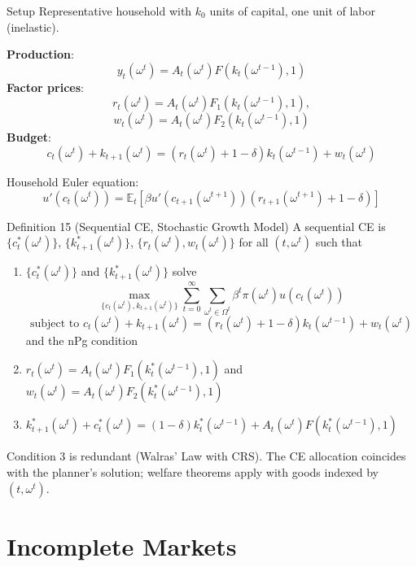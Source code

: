 \documentclass[blue]{beamer}
\newcommand{\E}{\mathbb{E}}
\begin{document}
\begin{frame}{Setup}
	Representative household with $k_0$ units of capital, one unit of labor (inelastic).
	

	\textbf{Production}: $$
	y_t(\omega^t) = A_t(\omega^t) F(k_t(\omega^{t-1}), 1)
	$$
	\textbf{Factor prices}: 
	$$r_t(\omega^t) = A_t(\omega^t) F_1(k_t(\omega^{t-1}), 1),$$ 
	$$
	w_t(\omega^t) = A_t(\omega^t) F_2(k_t(\omega^{t-1}), 1)
	$$
	\textbf{Budget}: 
	$$
	c_t(\omega^t) + k_{t+1}(\omega^t) = (r_t(\omega^t) + 1-\delta)k_t(\omega^{t-1}) + w_t(\omega^t)
	$$
	

	Household Euler equation:
	\[
	u'(c_t(\omega^t)) = \E_t[\beta u'(c_{t+1}(\omega^{t+1}))(r_{t+1}(\omega^{t+1}) + 1 - \delta)]
	\]
\end{frame}

\begin{frame}{Definition 15 (Sequential CE, Stochastic Growth Model)}
	\small
	A sequential CE is $\{c_t^*(\omega^t)\}$, $\{k_{t+1}^*(\omega^t)\}$, $\{r_t(\omega^t), w_t(\omega^t)\}$ for all $(t, \omega^t)$ such that
	
	\begin{enumerate}
		\item $\{c_t^*(\omega^t)\}$ and $\{k_{t+1}^*(\omega^t)\}$ solve
		\[
		\max_{\{c_t(\omega^t), k_{t+1}(\omega^t)\}} \sum_{t=0}^{\infty} \sum_{\omega^t \in \Omega^t} \beta^t \pi(\omega^t) u(c_t(\omega^t))
		\]
		\[
		\text{subject to } c_t(\omega^t) + k_{t+1}(\omega^t) = (r_t(\omega^t) + 1-\delta) k_t(\omega^{t-1}) + w_t(\omega^t)
		\]
		\quad\quad\quad\quad and the nPg condition
		
		\item $r_t(\omega^t) = A_t(\omega^t) F_1(k_t^*(\omega^{t-1}), 1)$ and $w_t(\omega^t) = A_t(\omega^t) F_2(k_t^*(\omega^{t-1}), 1)$
		
		\item $k_{t+1}^*(\omega^t) + c_t^*(\omega^t) = (1-\delta)k_t^*(\omega^{t-1}) + A_t(\omega^t) F(k_t^*(\omega^{t-1}), 1)$
	\end{enumerate}
	
	\normalsize
	Condition 3 is redundant (Walras' Law with CRS). The CE allocation coincides with the planner's solution; welfare theorems apply with goods indexed by $(t, \omega^t)$.
\end{frame}

\section{Incomplete Markets}
\end{document}
